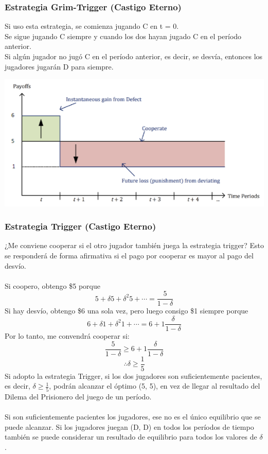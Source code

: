 \documentclass{article}
\begin{document}
        \subsubsection*{Estrategia Grim-Trigger (Castigo Eterno)}
            Si uso esta estrategia, se comienza jugando C en t = 0. \\
            Se sigue jugando C siempre y cuando los dos hayan jugado C en el período anterior. \\
            Si algún jugador no jugó C en el período anterior, es decir, se desvía, entonces los jugadores jugarán D para siempre. \\
            \begin{center}
                \includegraphics[width=0.75 \linewidth]{figs/grim-trigger.png}
            \end{center}
        \subsubsection*{Estrategia Trigger (Castigo Eterno)}
            ¿Me conviene cooperar si el otro jugador también juega la estrategia trigger? Esto se responderá de forma afirmativa si el pago por cooperar es mayor al pago del desvío. \\
            \\
            Si coopero, obtengo \$5 porque \[5 + \delta 5 + \delta^{2}5 + \cdots = \frac{5}{1-\delta}\]
            Si hay desvío, obtengo \$6 una sola vez, pero luego consigo \$1 siempre porque \[6 + \delta 1 + \delta^{2}1 + \cdots = 6 + 1\frac{\delta}{1-\delta}\]
            Por lo tanto, me convendrá cooperar si: \[\frac{5}{1-\delta} \geq 6 + 1\frac{\delta}{1-\delta}\] \[\therefore \delta \geq \frac{1}{5}\]
            Si adopto la estrategia Trigger, si los dos jugadores son suficientemente pacientes, es decir, \(\delta \geq \frac{1}{5}\), podrán alcanzar el óptimo (5, 5), en vez de llegar al resultado del Dilema del Prisionero del juego de un período. \\
            \\
            Si son suficientemente pacientes los jugadores, ese no es el único equilibrio que se puede alcanzar. Si los jugadores juegan (D, D) en todos los períodos de tiempo también se puede considerar un resultado de equilibrio para todos los valores de $\delta$.
\end{document}
